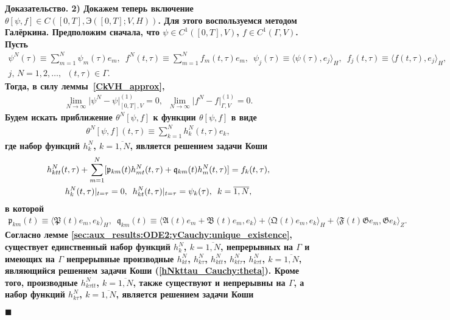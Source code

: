 \documentclass{report}
\newenvironment{Proof}{\par\noindent\bf Доказательство.\rm}{ $\blacksquare$\par}
\begin{document}
\begin{Proof}
2) Докажем теперь включение $\theta[\psi,f]\in C([0,T],\textrm{Э}([0,T];V,H))$. Для этого воспользуемся методом Галёркина. Предположим сначала, что $\psi\in C^1([0,T],V)$, $f\in C^1(\Gamma,V)$. Пусть
\begin{gather*}
\psi^N(\tau)\equiv\sum\limits_{m=1}^N\psi_m(\tau)e_m,\,\,\,f^N(t,\tau)\equiv\sum\limits_{m=1}^Nf_m(t,\tau)e_m,\,\,\,\psi_j(\tau)\equiv\langle\psi(\tau),e_j\rangle_H,\,\,\,f_j(t,\tau)\equiv\langle f(t,\tau),e_j\rangle_H,\\
j,\,N=1,2,\dots,\,\,\,(t,\tau)\in\Gamma.
\end{gather*}
Тогда, в силу леммы~\ref{CkVH_approx},
\begin{gather}\label{psiN_fN_convergence:nonaut:parametric}
\lim\limits_{N\to\infty}\pmb{|}\psi^N-\psi\pmb{|}^{(1)}_{[0,T],V}=0,\,\,\,\lim\limits_{N\to\infty}\pmb{|}f^N-f\pmb{|}^{(1)}_{\Gamma,V}=0.
\end{gather}
Будем искать приближение $\theta^N[\psi,f]$ к функции $\theta[\psi,f]$ в виде
\begin{gather*}
\theta^N[\psi,f](t,\tau)\equiv\sum\limits_{k=1}^Nh^N_k(t,\tau)e_k,
\end{gather*}
где набор функций $h^N_k$, $k=\overline{1,N}$, является решением задачи Коши
\begin{gather}\label{hNkttau_Cauchy:theta}
h^N_{ktt}(t,\tau)+\sum\limits_{m=1}^N[\mathfrak{p}_{km}(t)h^N_{mt}(t,\tau)+\mathfrak{q}_{km}(t)h^N_{m}(t,\tau)]=f_k(t,\tau),\\
\notag h^N_k(t,\tau)|_{t=\tau}=0,\,\,\,h^N_{kt}(t,\tau)|_{t=\tau}=\psi_k(\tau),\,\,\,k=\overline{1,N},
\end{gather}
в которой
\begin{gather*}
\mathfrak{p}_{km}(t)\equiv\langle\mathfrak{P}(t)e_m,e_k\rangle_H,\,\,\,\mathfrak{q}_{km}(t)\equiv\langle\mathfrak{A}(t)e_m+\mathfrak{B}(t)e_m,e_k\rangle+\langle\mathfrak{Q}(t)e_m,e_k\rangle_H+
\langle\mathfrak{F}(t)\mathfrak{G}e_m,\mathfrak{G}e_k\rangle_Z.
\end{gather*}
Согласно лемме \ref{sec:aux_results:ODE2:yCauchy:unique_existence}, существует единственный набор функций $h_k^N$, $k=\overline{1,N}$, непрерывных на $\Gamma$ и имеющих на $\Gamma$
непрерывные производные $h^N_{kt}$, $h^N_{k\tau}$, $h^N_{ktt}$, $h^N_{kt\tau}$, $h^N_{k\tau t}$, $k=\overline{1,N}$, являющийся решением задачи Коши (\ref{hNkttau_Cauchy:theta}).
Кроме того, производные $h^N_{k\tau tt}$, $k=\overline{1,N}$, также существуют и непрерывны на $\Gamma$, а набор функций $h_{k\tau}^N$, $k=\overline{1,N}$, является решением задачи Коши

\end{Proof}
\end{document}
